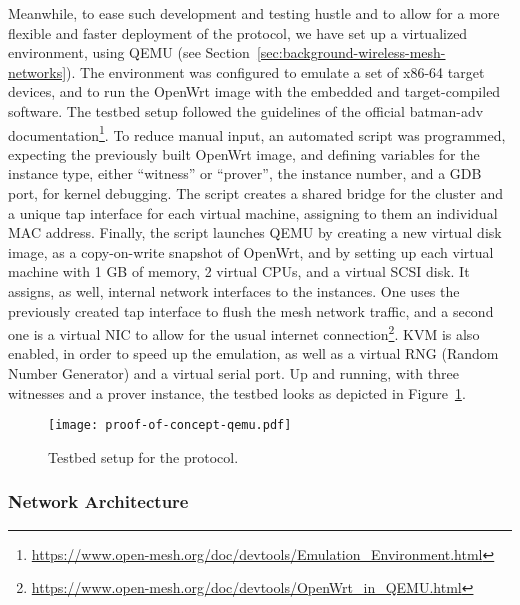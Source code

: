 Meanwhile, to ease such development and testing hustle and to allow for a more flexible and faster deployment of the protocol, we have set up a virtualized environment, using QEMU (see Section~\ref{sec:background-wireless-mesh-networks}). The environment was configured to emulate a set of x86-64 target devices, and to run the OpenWrt image with the embedded and target-compiled \pol{} software. The testbed setup followed the guidelines of the official batman-adv documentation\footnote{\url{https://www.open-mesh.org/doc/devtools/Emulation_Environment.html}}. To reduce manual input, an automated script was programmed, expecting the previously built OpenWrt image, and defining variables for the instance type, either “witness” or “prover”, the instance number, and a GDB port, for kernel debugging. The script creates a shared bridge for the cluster and a unique tap interface for each virtual machine, assigning to them an individual MAC address. Finally, the script launches QEMU by creating a new virtual disk image, as a copy-on-write snapshot of OpenWrt, and by setting up each virtual machine with 1 GB of memory, 2 virtual CPUs, and a virtual SCSI disk. It assigns, as well, internal network interfaces to the instances. One uses the previously created tap interface to flush the mesh network traffic, and a second one is a virtual NIC to allow for the usual internet connection\footnote{\url{https://www.open-mesh.org/doc/devtools/OpenWrt_in_QEMU.html}}. KVM is also enabled, in order to speed up the emulation, as well as a virtual RNG (Random Number Generator) and a virtual serial port. Up and running, with three witnesses and a prover instance, the testbed looks as depicted in Figure~\ref{fig:infrastructure:testbed}.

\begin{figure}[h!]
    \begin{center}
    \texttt{[image: proof-of-concept-qemu.pdf]}
    \caption{Testbed setup for the \pol{} protocol.}
    \label{fig:infrastructure:testbed}
    \end{center}
\end{figure}

\subsubsection{Network Architecture} \label{sec:infrastructure:network-architecture}

